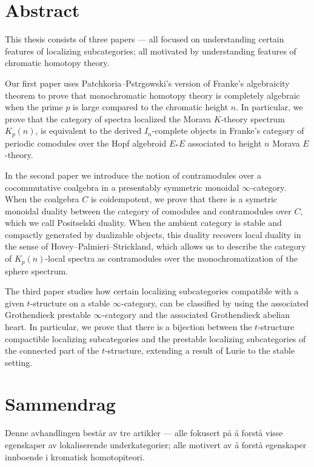

\section*{Abstract}

This thesis consists of three papers --- all focused on understanding certain features of localizing subcategories; all motivated by understanding features of chromatic homotopy theory. 

Our first paper uses Patchkoria--Pstr\a{}gowski's version of Franke's algebraicity theorem to prove that monochromatic homotopy theory is completely algebraic when the prime $p$ is large compared to the chromatic height $n$. In particular, we prove that the category of spectra localized the Morava $K$-theory spectrum $K_p(n)$, is equivalent to the derived $I_n$-complete objects in Franke's category of periodic comodules over the Hopf algebroid $E_*E$ associated to height $n$ Morava $E$-theory. 

In the second paper we introduce the notion of contramodules over a cocommutative coalgebra in a presentably symmetric monoidal $\infty$-category. When the coalgebra $C$ is coidempotent, we prove that there is a symetric monoidal duality between the category of comodules and contramodules over $C$, which we call Positselski duality. When the ambient category is stable and compactly generated by dualizable objects, this duality recovers local duality in the sense of Hovey--Palmieri--Strickland, which allows us to describe the category of $K_p(n)$-local spectra as contramodules over the monochromatization of the sphere spectrum. 

The third paper studies how certain localizing subcategories compatible with a given $t$-structure on a stable $\infty$-category, can be classified by using the associated Grothendieck prestable $\infty$-category and the associated Grothendieck abelian heart. In particular, we prove that there is a bijection between the $t$-structure compactible localizing subcategories and the prestable localizing subcategories of the connected part of the $t$-structure, extending a result of Lurie to the stable setting. 


\newpage 
\section*{Sammendrag}

Denne avhandlingen består av tre artikler --- alle fokusert på å forstå visse egenskaper av lokaliserende underkategorier; alle motivert av å forstå egenskaper innboende i kromatisk homotopiteori. 


